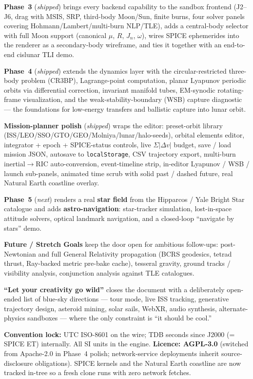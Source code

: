 \documentclass[11pt, a4paper]{article}
\begin{document}
\textbf{Phase~3} (\emph{shipped}) brings every backend capability to the
sandbox frontend (J2--J6, drag with MSIS, SRP, third-body Moon/Sun, finite
burns, four solver panels covering Hohmann/Lambert/multi-burn NLP/TLE), adds
a central-body selector with full Moon support (canonical $\mu$, $R$, $J_n$,
$\omega$), wires SPICE ephemerides into the renderer as a secondary-body
wireframe, and ties it together with an end-to-end cislunar TLI demo.

\textbf{Phase~4} (\emph{shipped}) extends the dynamics layer with the
circular-restricted three-body problem (CR3BP), Lagrange-point computation,
planar Lyapunov periodic orbits via differential correction, invariant
manifold tubes, EM-synodic rotating-frame visualization, and the
weak-stability-boundary (WSB) capture diagnostic --- the foundations for
low-energy transfers and ballistic capture into lunar orbit.

\textbf{Mission-planner polish} (\emph{shipped}) wraps the editor:
preset-orbit library (ISS/LEO/SSO/GTO/GEO/Molniya/lunar/halo-seeds), orbital
elements editor, integrator + epoch + SPICE-status controls, live $\Sigma|\Delta v|$
budget, save / load mission JSON, autosave to \texttt{localStorage}, CSV
trajectory export, multi-burn inertial$\to$RIC auto-conversion, event-timeline
strip, in-editor Lyapunov / WSB / launch sub-panels, animated time scrub with
solid past / dashed future, real Natural Earth coastline overlay.

\textbf{Phase~5} (\emph{next}) renders a real \textbf{star field} from the
Hipparcos / Yale Bright Star catalogue and adds \textbf{astro-navigation}:
star-tracker simulation, lost-in-space attitude solvers, optical landmark
navigation, and a closed-loop ``navigate by stars'' demo.

\textbf{Future / Stretch Goals} keep the door open for ambitious follow-ups:
post-Newtonian and full General Relativity propagation (BCRS geodesics,
tetrad thrust, Ray-backed metric pre-bake cache), tesseral gravity, ground
tracks / visibility analysis, conjunction analysis against TLE catalogues.

\textbf{``Let your creativity go wild''} closes the document with a
deliberately open-ended list of blue-sky directions --- tour mode, live
ISS tracking, generative trajectory design, asteroid mining, solar sails,
WebXR, audio synthesis, alternate-physics sandboxes --- where the only
constraint is ``it should be cool.''

\begin{notebox}
\textbf{Convention lock:}
UTC ISO-8601 on the wire; TDB seconds since J2000 (= SPICE ET) internally.
All SI units in the engine.
\textbf{Licence: AGPL-3.0} (switched from Apache-2.0 in Phase~4 polish;
network-service deployments inherit source-disclosure obligations).
SPICE kernels and the Natural Earth coastline are now tracked in-tree so a
fresh clone runs with zero network fetches.
\end{notebox}
\end{document}
